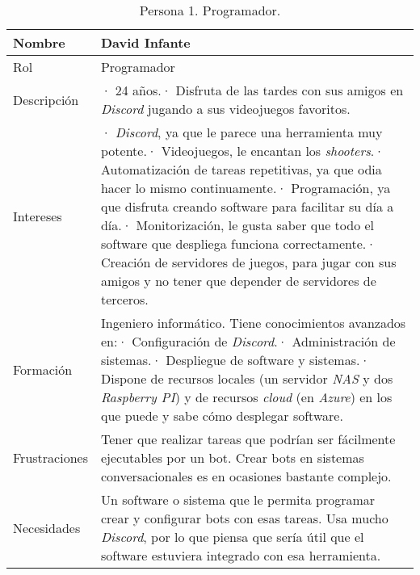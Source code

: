 \FloatBarrier
\begin{table}[h]
    \centering
    \def\arraystretch{1.25}
    \begin{adjustbox}{max width=\textwidth}
    \begin{tabularx}{\textwidth}{|l|L|}
    \hline
        \textbf{Nombre} & \textbf{David Infante} \\ \hline
    \hline
        Rol & Programador \\ \hline
        Descripción & · 24 años.\linebreak · Disfruta de las tardes con sus amigos en \textit{Discord} jugando a sus videojuegos favoritos. \\ \hline
        Intereses & · \textit{Discord}, ya que le parece una herramienta muy potente.\linebreak · Videojuegos, le encantan los \textit{shooters}.\linebreak · Automatización de tareas repetitivas, ya que odia hacer lo mismo continuamente.\linebreak · Programación, ya que disfruta creando software para facilitar su día a día.\linebreak · Monitorización, le gusta saber que todo el software que despliega funciona correctamente.\linebreak · Creación de servidores de juegos, para jugar con sus amigos y no tener que depender de servidores de terceros. \\ \hline
        Formación & Ingeniero informático. Tiene conocimientos avanzados en:\linebreak · Configuración de \textit{Discord}.\linebreak · Administración de sistemas.\linebreak · Despliegue de software y sistemas.\linebreak · Dispone de recursos locales (un servidor \textit{NAS} y dos \textit{Raspberry PI}) y de recursos \textit{cloud} (en \textit{Azure}) en los que puede y sabe cómo desplegar software. \\ \hline
        Frustraciones & Tener que realizar tareas que podrían ser fácilmente ejecutables por un bot. Crear bots en sistemas conversacionales es en ocasiones bastante complejo. \\ \hline
        Necesidades & Un software o sistema que le permita programar crear y configurar bots con esas tareas. Usa mucho \textit{Discord}, por lo que piensa que sería útil que el software estuviera integrado con esa herramienta. \\ \hline
    \end{tabularx}
    \end{adjustbox}
    \caption{Persona 1. Programador.}
\end{table}
\FloatBarrier


